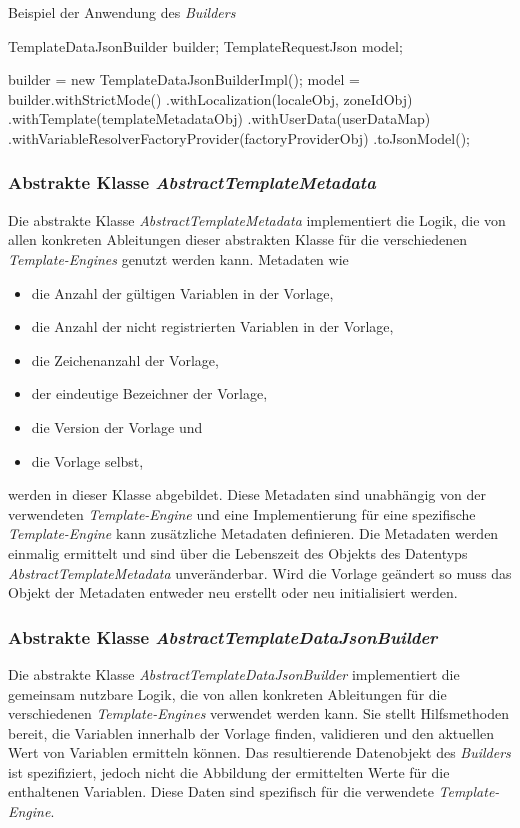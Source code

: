 \begin{program}[h]
\caption{Beispiel der Anwendung des \emph{Builders}}
\label{prog:templateDataJsonBuilder-example}
\begin{JavaCode}
TemplateDataJsonBuilder builder;
TemplateRequestJson     model;

builder = new TemplateDataJsonBuilderImpl();
model   = builder.withStrictMode() 
               .withLocalization(localeObj, zoneIdObj)
               .withTemplate(templateMetadataObj)
               .withUserData(userDataMap)
               .withVariableResolverFactoryProvider(factoryProviderObj)
               .toJsonModel();
\end{JavaCode}
\end{program}

\subsubsection{Abstrakte Klasse \emph{AbstractTemplateMetadata}}
\label{sec:abstractTemplateMetadata}
Die abstrakte Klasse \emph{AbstractTemplateMetadata} implementiert die Logik, die von allen konkreten Ableitungen dieser abstrakten Klasse für die verschiedenen \emph{Template-Engines} genutzt werden kann. Metadaten wie
\begin{itemize}
	\item die Anzahl der gültigen Variablen in der Vorlage,
	\item die Anzahl der nicht registrierten Variablen in der Vorlage,
	\item die Zeichenanzahl der Vorlage,
	\item der eindeutige Bezeichner der Vorlage,
	\item die Version der Vorlage und
	\item die Vorlage selbst,  
\end{itemize}
werden in dieser Klasse abgebildet.
\newline
Diese Metadaten sind unabhängig von der verwendeten \emph{Template-Engine} und eine Implementierung für eine spezifische \emph{Template-Engine} kann zusätzliche Metadaten definieren. Die Metadaten werden einmalig ermittelt und sind über die Lebenszeit des Objekts des Datentyps \emph{AbstractTemplateMetadata} unveränderbar. Wird die Vorlage geändert so muss das Objekt der Metadaten entweder neu erstellt oder neu initialisiert werden.

\subsubsection{Abstrakte Klasse \emph{AbstractTemplateDataJsonBuilder}}
\label{sec:abstractTemplateDataJsonBuilder}
Die abstrakte Klasse \emph{AbstractTemplateDataJsonBuilder} implementiert die gemeinsam nutzbare Logik, die von allen konkreten Ableitungen für die verschiedenen \emph{Template-Engines} verwendet werden kann. Sie stellt Hilfsmethoden bereit, die Variablen innerhalb der Vorlage finden, validieren und den aktuellen Wert von Variablen ermitteln können. Das resultierende Datenobjekt des \emph{Builders} ist spezifiziert, jedoch nicht die Abbildung der ermittelten Werte für die enthaltenen Variablen. Diese Daten sind spezifisch für die verwendete \emph{Template-Engine}.

